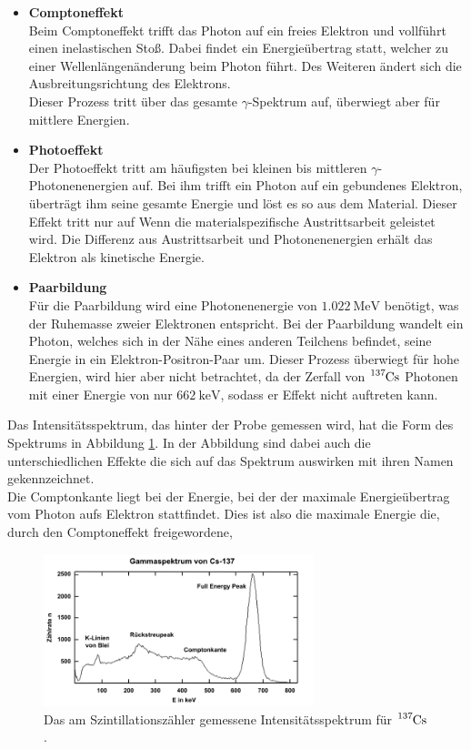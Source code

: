 \noindent
\begin{itemize}
    \item \textbf{Comptoneffekt}\\
        Beim Comptoneffekt trifft das Photon auf ein freies Elektron und vollführt einen inelastischen Stoß. 
        Dabei findet ein Energieübertrag statt, welcher zu einer Wellenlängenänderung beim Photon führt. 
        Des Weiteren ändert sich die Ausbreitungsrichtung des Elektrons.\\
        Dieser Prozess tritt über das gesamte $\gamma$-Spektrum auf, überwiegt aber für mittlere Energien.
    \item \textbf{Photoeffekt}\\
        Der Photoeffekt tritt am häufigsten bei kleinen bis mittleren $\gamma$-Photonenenergien auf. Bei ihm trifft ein Photon auf ein gebundenes Elektron, 
        überträgt ihm seine gesamte Energie und löst es so aus dem Material. Dieser Effekt tritt nur auf Wenn die materialspezifische Austrittsarbeit geleistet wird.
        Die Differenz aus Austrittsarbeit und Photonenenergien erhält das Elektron als kinetische Energie.
    \item \textbf{Paarbildung}\\
        Für die Paarbildung wird eine Photonenenergie von $\SI{1.022}{\mega\electronvolt}$ benötigt, was der Ruhemasse zweier Elektronen entspricht.
        Bei der Paarbildung wandelt ein Photon, welches sich in der Nähe eines anderen Teilchens befindet, seine Energie in ein Elektron-Positron-Paar um.
        Dieser Prozess überwiegt für hohe Energien, wird hier aber nicht betrachtet, da der Zerfall von $\ce{^{137}Cs}$ Photonen mit einer Energie von nur 
        $\SI{662}{\kilo\electronvolt}$, sodass er Effekt nicht auftreten kann.
\end{itemize}

\noindent
Das Intensitätsspektrum, das hinter der Probe gemessen wird, hat die Form des Spektrums in Abbildung \ref{img:spek}. 
In der Abbildung sind dabei auch die unterschiedlichen Effekte die sich auf das Spektrum auswirken mit ihren Namen gekennzeichnet.\\
Die Comptonkante liegt bei der Energie, bei der der maximale Energieübertrag vom Photon aufs Elektron stattfindet. 
Dies ist also die maximale Energie die, durch den Comptoneffekt freigewordene, 

\begin{figure}[H]
    \centering
    \includegraphics[width=0.7\textwidth]{latex/images/Spektrum.PNG}
    \caption{Das am Szintillationszähler gemessene Intensitätsspektrum für $\ce{^{137}Cs}$ \protect \cite{leifi}.}
    \label{img:spek}
\end{figure}